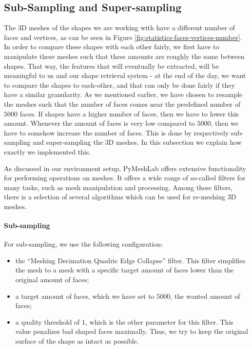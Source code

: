 \subsection{Sub-Sampling and Super-sampling}
The 3D meshes of the shapes we are working with have a different number of faces and vertices, as can be seen in
Figure \ref{fig:statistics-faces-vertices-number}.
In order to compare these shapes with each other fairly, we first have to manipulate these meshes such that these
amounts are roughly the same between shapes.
That way, the features that will eventually be extracted, will be meaningful to us and our shape retrieval system -
at the end of the day, we want to compare the shapes to each-other, and that can only be done fairly if they have a
similar granularity.
As we mentioned earlier, we have chosen to resample the meshes such that the number of faces comes near the predefined
number of $5000$ faces.
If shapes have a higher number of faces, then we have to lower this amount.
Whenever the amount of faces is very low compared to $5000$, then we have to somehow increase the number of faces.
This is done by respectively sub-sampling and super-sampling the 3D meshes.
In this subsection we explain how exactly we implemented this.

As discussed in our environment setup, PyMeshLab offers extensive functionality for performing operations on meshes.
It offers a wide range of so-called filters for many tasks, such as mesh manipulation and processing.
Among these filters, there is a selection of several algorithms which can be used for re-meshing 3D meshes.

\paragraph{Sub-sampling}
For sub-sampling, we use the following configuration:
\begin{itemize}
    \item the ``Meshing Decimation Quadric Edge Collapse'' filter. This filter simplifies the mesh to a mesh with a
    specific target amount of faces lower than the original amount of faces;
    \item a target amount of faces, which we have set to $5000$, the wanted amount of faces;
    \item a quality threshold of $1$, which is the other parameter for this filter. This value penalizes bad shaped faces maximally. Thus, we try to keep the original surface of the shape as intact as possible.
\end{itemize}

